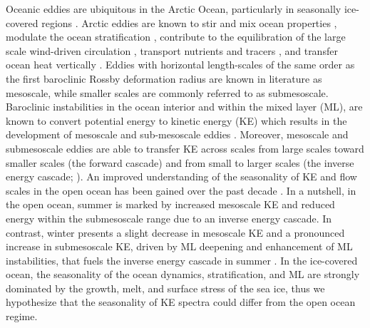 \documentclass[draft]{agujournal2019}
\begin{document}
Oceanic eddies are ubiquitous in the Arctic Ocean, particularly in seasonally ice-covered regions \citep{Cassianides_eddies_2023}. Arctic eddies are known to stir and mix ocean properties \citep{Fine_Microstructure_2018}, modulate the ocean stratification \citep{Pnyushkov_stratification_2018}, contribute to the equilibration of the large scale wind-driven circulation \citep{Lique_eddy_2015}, transport nutrients and tracers \citep{watanabe_nutrients_2014}, and transfer ocean heat vertically \citep{Bebieva_mixing_2016}. Eddies with horizontal length-scales of the same order as the first baroclinic Rossby deformation radius \citep[$\mathit{O}\sim 10\ km$ in the Arctic Basin;][]{Nurser_rossby_2014} are known in literature as mesoscale, while smaller scales are commonly referred to as submesoscale. Baroclinic instabilities in the ocean interior and within the mixed layer (ML), are known to convert potential energy to kinetic energy (KE) which results in the development of mesoscale and sub-mesoscale eddies \citep{FoxKemper_eddies_2008}.
Moreover, mesoscale and submesoscale eddies are able to transfer KE across scales from large scales toward smaller scales (the forward cascade) and from small to larger scales (the inverse energy cascade; \citealt{Srinivasan_submesoscale_2023, Naveira_KE_2022, Ferrari_KE_2009}). 
An improved understanding of the seasonality of KE and flow scales in the open ocean has been gained over the past decade \citep{Rocha_Seasonality_2016, Buckingham_submesoscale_2016, Qiu_seasonal_2014}. 
In a nutshell, in the open ocean, summer is marked by increased mesoscale KE and reduced energy within the submesoscale range due to an inverse energy cascade. In contrast, winter presents a slight decrease in mesoscale KE and a pronounced increase in submesoscale KE, driven by ML deepening and enhancement of ML instabilities, that fuels the inverse energy cascade in summer \citep{Yu_Seasonality_2023, Uchida_seasonal_2017,Sasaki_seasonal_2014}. 
In the ice-covered ocean, the seasonality of the ocean dynamics, stratification, and ML are strongly dominated by the growth, melt, and surface stress of the sea ice, thus we hypothesize that the seasonality of KE spectra could differ from the open ocean regime.
\end{document}
